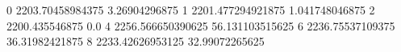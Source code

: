 0 2203.70458984375 3.26904296875
1 2201.477294921875 1.041748046875
2 2200.435546875 0.0
4 2256.566650390625 56.131103515625
6 2236.75537109375 36.31982421875
8 2233.42626953125 32.99072265625

